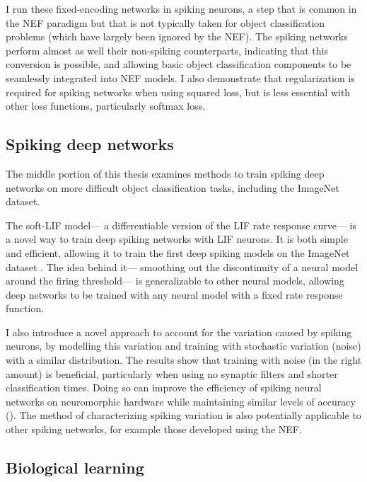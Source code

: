 I run these fixed-encoding networks in spiking neurons,
a step that is common in the NEF paradigm
but that is not typically taken for object classification problems
(which have largely been ignored by the NEF).
The spiking networks perform almost as well their non-spiking counterparts,
indicating that this conversion is possible,
and allowing basic object classification components
to be seamlessly integrated into NEF models.
I also demonstrate that regularization is required for spiking networks
when using squared loss,
but is less essential with other loss functions,
particularly softmax loss.


\subsection{Spiking deep networks}

The middle portion of this thesis examines methods
to train spiking deep networks on more difficult object classification tasks,
including the ImageNet dataset.

The soft-LIF model---%
a differentiable version of the LIF rate response curve---%
is a novel way to train deep spiking networks with LIF neurons.
It is both simple and efficient,
allowing it to train the first deep spiking models
on the ImageNet dataset \parencite{Hunsberger2016}.
The idea behind it---%
smoothing out the discontinuity of a neural model around the firing threshold---%
is generalizable to other neural models,
allowing deep networks to be trained with any neural model
with a fixed rate response function.

I also introduce a novel approach to account for the variation
caused by spiking neurons,
by modelling this variation and training with
stochastic variation (noise) with a similar distribution.
The results show that training with noise (in the right amount) is beneficial,
particularly when using no synaptic filters and shorter classification times.
Doing so can improve the efficiency of spiking neural networks
on neuromorphic hardware
while maintaining similar levels of accuracy ().
The method of characterizing spiking variation is also potentially applicable
to other spiking networks,
for example those developed using the NEF.


\subsection{Biological learning}


